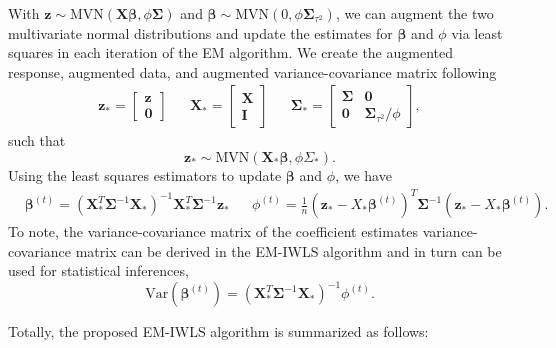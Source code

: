 \documentclass[AMA,STIX1COL,]{WileyNJD-v2}
\begin{document}
With
\(\boldsymbol{z}\sim \text{MVN}(\boldsymbol{X} \boldsymbol{\beta}, \phi \boldsymbol{\Sigma})\)
and
\(\boldsymbol{\beta }\sim \text{MVN}(0, \phi \boldsymbol{\Sigma}_{\tau^2})\),
we can augment the two multivariate normal distributions and update the
estimates for \(\boldsymbol{\beta}\) and \(\phi\) via least squares in
each iteration of the EM algorithm. We create the augmented response,
augmented data, and augmented variance-covariance matrix following
\begin{align*}
& \boldsymbol{z}_* = \begin{bmatrix} \boldsymbol{z}\\ \boldsymbol{0}\end{bmatrix} &&
  \boldsymbol{X}_* = \begin{bmatrix} \boldsymbol{X} \\ \boldsymbol{I} \end{bmatrix} &&
  \boldsymbol{\Sigma}_* = \begin{bmatrix} \boldsymbol{\Sigma }& \boldsymbol{0}  \\ \boldsymbol{0} & \boldsymbol{\Sigma}_{\tau^2}/\phi \end{bmatrix}, &
\end{align*} such that \[
\boldsymbol{z}_* \sim \text{MVN}(\boldsymbol{X}_* \boldsymbol{\beta }, \phi \Sigma_*).
\] Using the least squares estimators to update \(\boldsymbol{\beta}\)
and \(\phi\), we have \begin{align*}
& \boldsymbol{\beta}^{(t)} = (\boldsymbol{X}_*^T \boldsymbol{\Sigma}^{-1} \boldsymbol{X}_*)^{-1}\boldsymbol{X}_*^T \boldsymbol{\Sigma}^{-1} \boldsymbol{z}_* && \phi^{(t)} = \frac{1}{n}(\boldsymbol{z}_*-X_*\boldsymbol{\beta}^{(t)})^T\boldsymbol{\Sigma}^{-1}(\boldsymbol{z}_*-X_*\boldsymbol{\beta}^{(t)}).&
\end{align*} To note, the variance-covariance matrix of the coefficient
estimates variance-covariance matrix can be derived in the EM-IWLS
algorithm and in turn can be used for statistical inferences, \[
  \text{Var}(\boldsymbol{\beta}^{(t)}) = (\boldsymbol{X}_*^T\boldsymbol{\Sigma}^{-1} \boldsymbol{X}_*)^{-1}\phi^{(t)}.
\]

Totally, the proposed EM-IWLS algorithm is summarized as follows:
\end{document}
